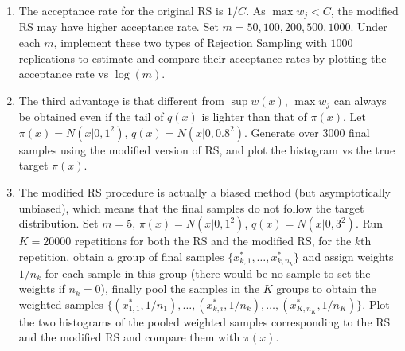\documentclass[notitlepage,a4paper,12pt]{article}%
\begin{document}
\begin{enumerate}
\begin{enumerate}
\item The acceptance rate for the original RS is $1/C$. As $\max w_j<C$, the modified RS may have higher acceptance rate. Set $m=50, 100, 200, 500, 1000$. Under each $m$, implement these two types of Rejection Sampling 
    with $1000$ replications to estimate and compare their acceptance rates by plotting the acceptance rate vs $\log(m)$.

\item The third advantage is that different from $\sup w(x)$, $\max w_j$ can always be obtained even if the tail of $q(x)$ is lighter than that of $\pi(x)$.
Let $\pi(x)=N(x|0,1^2)$, $q(x)=N(x|0,0.8^2)$. Generate over 3000 final samples using the modified version of RS, and plot
the histogram vs the true target $\pi(x)$.

\item 
The modified RS procedure is actually a biased method (but asymptotically unbiased), which means that the final samples do not follow the target distribution. Set $m=5$, $\pi(x)=N(x|0,1^2)$, $q(x)=N(x|0,3^2)$. Run $K=20000$ repetitions for both the RS and the modified RS, for the $k$th repetition, obtain a group of final samples $\{x_{k,1}^*,\dots,x_{k,n_k}^*\}$ and assign weights $1/n_k$ for each sample in this group (there would be no sample to set the weights if $n_k=0$), finally pool the samples in the $K$ groups to obtain 
the weighted samples $\{(x_{1,1}^*,1/n_1),\dots,(x_{k,i}^*,1/n_k),\dots,(x_{K,n_K}^*,1/n_K)\}$. 
Plot the two histograms of the pooled weighted samples corresponding to the RS and the modified RS and compare them with $\pi(x)$.

\end{enumerate}


\end{enumerate}
\end{document}
